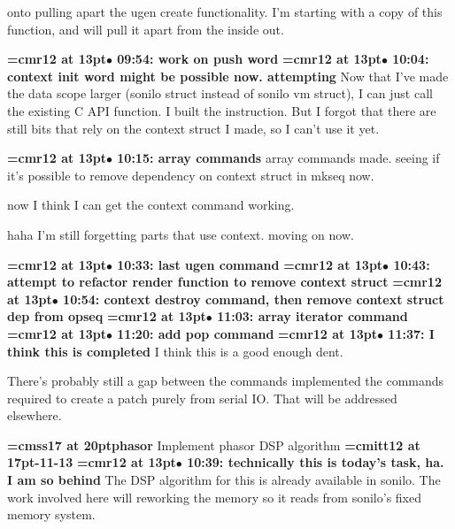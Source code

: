 onto pulling apart the ugen create functionality. I'm starting with a copy of this function, and will pull it apart from the inside out.
\par

{\smallskip\noindent\bf\font\titlefont=cmr12 at 13pt\titlefont $\bullet$ 09:54: work on push word}\smallskip
{\smallskip\noindent\bf\font\titlefont=cmr12 at 13pt\titlefont $\bullet$ 10:04: context init word might be possible now. attempting}\smallskip
Now that I've made the data scope larger (sonilo struct instead of sonilo vm struct), I can just call the existing C API function. I built the instruction. But I forgot that there are still bits that rely on the context struct I made, so I can't use it yet.
\par

{\smallskip\noindent\bf\font\titlefont=cmr12 at 13pt\titlefont $\bullet$ 10:15: array commands}\smallskip
array commands made. seeing if it's possible to remove dependency on context struct in mkseq now.
\par

now I think I can get the context command working.
\par

haha I'm still forgetting parts that use context. moving on now.
\par

{\smallskip\noindent\bf\font\titlefont=cmr12 at 13pt\titlefont $\bullet$ 10:33: last ugen command}\smallskip
{\smallskip\noindent\bf\font\titlefont=cmr12 at 13pt\titlefont $\bullet$ 10:43: attempt to refactor render function to remove context struct}\smallskip
{\smallskip\noindent\bf\font\titlefont=cmr12 at 13pt\titlefont $\bullet$ 10:54: context destroy command, then remove context struct dep from opseq}\smallskip
{\smallskip\noindent\bf\font\titlefont=cmr12 at 13pt\titlefont $\bullet$ 11:03: array iterator command}\smallskip
{\smallskip\noindent\bf\font\titlefont=cmr12 at 13pt\titlefont $\bullet$ 11:20: add pop command}\smallskip
{\smallskip\noindent\bf\font\titlefont=cmr12 at 13pt\titlefont $\bullet$ 11:37: I think this is completed}\smallskip
I think this is a good enough dent.
\par

There's probably still a gap between the commands implemented the commands required to create a patch purely from serial IO. That will be addressed elsewhere.
\par

{\medskip\noindent\bf\font\titlefont=cmss17 at 20pt\titlefont phasor}\medskip
Implement phasor DSP algorithm
{\medskip\noindent\bf\font\titlefont=cmitt12 at 17pt-11-13}\medskip
{\smallskip\noindent\bf\font\titlefont=cmr12 at 13pt\titlefont $\bullet$ 10:39: technically this is today's task, ha. I am so behind}\smallskip
The DSP algorithm for this is already available in sonilo. The work involved here will reworking the memory so it reads from sonilo's fixed memory system.
\par

